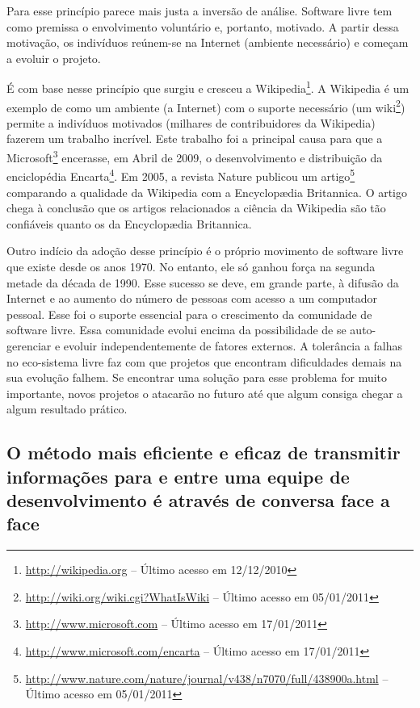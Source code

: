 Para esse princípio parece mais justa a inversão de análise. Software
livre tem como premissa o envolvimento voluntário e, portanto,
motivado. A partir dessa motivação, os indivíduos reúnem-se na
Internet (ambiente necessário) e começam a evoluir o projeto.

É com base nesse princípio que surgiu e cresceu a
Wikipedia\footnote{\url{http://wikipedia.org} -- Último acesso em
  12/12/2010}. A Wikipedia é um exemplo de como um ambiente (a
Internet) com o suporte necessário (um
wiki\footnote{\url{http://wiki.org/wiki.cgi?WhatIsWiki} -- Último
  acesso em 05/01/2011}) permite a indivíduos motivados (milhares de
contribuidores da Wikipedia) fazerem um trabalho incrível. Este
trabalho foi a principal causa para que a
Microsoft\footnote{\url{http://www.microsoft.com} -- Último acesso em
  17/01/2011} encerasse, em Abril de 2009, o desenvolvimento e
distribuição da enciclopédia
Encarta\footnote{\url{http://www.microsoft.com/encarta} -- Último
  acesso em 17/01/2011}. Em 2005, a revista Nature publicou um
artigo\footnote{\url{http://www.nature.com/nature/journal/v438/n7070/full/438900a.html}
  -- Último acesso em 05/01/2011} comparando a qualidade da Wikipedia
com a Encyclop{\ae}dia Britannica. O artigo chega à conclusão que os
artigos relacionados a ciência da Wikipedia são tão confiáveis quanto
os da Encyclop{\ae}dia Britannica.

Outro indício da adoção desse princípio é o próprio movimento de
software livre que existe desde os anos 1970. No entanto, ele só
ganhou força na segunda metade da década de 1990. Esse sucesso se
deve, em grande parte, à difusão da Internet e ao aumento do número de
pessoas com acesso a um computador pessoal. Esse foi o suporte
essencial para o crescimento da comunidade de software livre. Essa
comunidade evolui encima da possibilidade de se auto-gerenciar e
evoluir independentemente de fatores externos. A tolerância a falhas
no eco-sistema livre faz com que projetos que encontram dificuldades
demais na sua evolução falhem. Se encontrar uma solução para esse
problema for muito importante, novos projetos o atacarão no futuro até
que algum consiga chegar a algum resultado prático.

\subsection[Conversa face a face]{O método mais eficiente e eficaz de
  transmitir informações para e entre uma equipe de desenvolvimento é
  através de conversa face a face}

